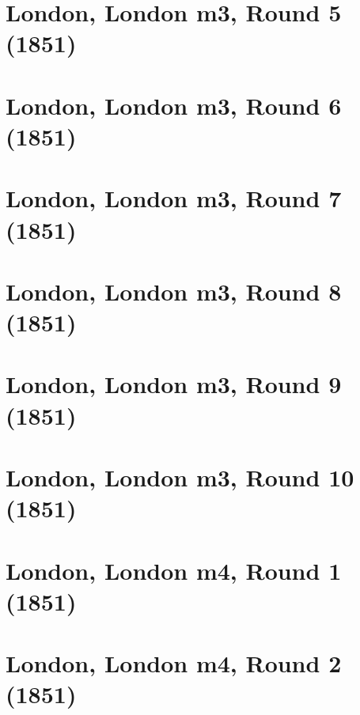 \documentclass[11pt]{article}
\newcommand*\cleartoleftpage{%
   \clearpage
   \ifodd\value{page}\hbox{}\newpage\fi
}
\begin{document}
\cleartoleftpage

\section{London, London m3, Round 5 (1851)}


\cleartoleftpage

\section{London, London m3, Round 6 (1851)}


\cleartoleftpage

\section{London, London m3, Round 7 (1851)}


\cleartoleftpage

\section{London, London m3, Round 8 (1851)}


\cleartoleftpage

\section{London, London m3, Round 9 (1851)}


\cleartoleftpage

\section{London, London m3, Round 10 (1851)}


\cleartoleftpage

\section{London, London m4, Round 1 (1851)}


\cleartoleftpage

\section{London, London m4, Round 2 (1851)}

\end{document}

